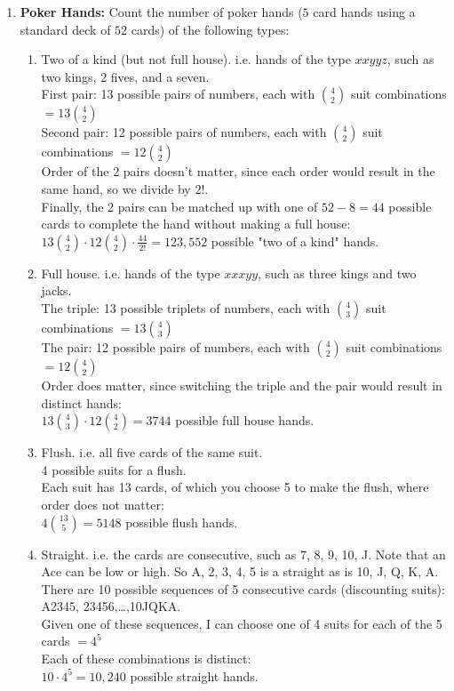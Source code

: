 \documentclass[11pt,fleqn]{article}
\begin{document}
\begin{enumerate}
\newpage
\item \textbf{Poker Hands:}
Count the number of poker hands ($5$ card hands using a standard deck of $52$ cards) of the following types:
\begin{enumerate}
\item Two of a kind (but not full house). i.e. hands of the type $xxyyz$, such as two kings, 2 fives, and a seven. \\
First pair: 13 possible pairs of numbers, each with $\binom{4}{2}$ suit combinations $=13\binom{4}{2}$ \\
Second pair: 12 possible pairs of numbers, each with $\binom{4}{2}$ suit combinations $=12\binom{4}{2}$ \\
Order of the 2 pairs doesn't matter, since each order would result in the same hand, so we divide by $2!$. \\
Finally, the 2 pairs can be matched up with one of $52-8=44$ possible cards to complete the hand without making a full house: \\
$13\binom{4}{2} \cdot 12\binom{4}{2} \cdot \frac{44}{2!} = 123,552$ possible "two of a kind" hands.
\item Full house. i.e. hands of the type $xxxyy$, such as three kings and two jacks. \\
The triple: 13 possible triplets of numbers, each with $\binom{4}{3}$ suit combinations $=13\binom{4}{3}$ \\
The pair: 12 possible pairs of numbers, each with $\binom{4}{2}$ suit combinations $=12\binom{4}{2}$ \\
Order does matter, since switching the triple and the pair would result in distinct hands: \\
$13\binom{4}{3} \cdot 12\binom{4}{2} = 3744$ possible full house hands.
\item Flush. i.e. all five cards of the same suit. \\
4 possible suits for a flush. \\
Each suit has 13 cards, of which you choose 5 to make the flush, where order does not matter: \\
$4\binom{13}{5} = 5148$ possible flush hands. 
\item Straight. i.e. the cards are consecutive, such as 7, 8, 9, 10, J. Note that an Ace can be low or high. 
So A, 2, 3, 4, 5 is a straight as is 10, J, Q, K, A. \\
There are 10 possible sequences of 5 consecutive cards (discounting suits): A2345, 23456,\ldots,10JQKA. \\
Given one of these sequences, I can choose one of 4 suits for each of the 5 cards $=4^5$ \\
Each of these combinations is distinct: \\
$10 \cdot 4^5 = 10,240$ possible straight hands.
\end{enumerate}


\end{enumerate}
\end{document}
